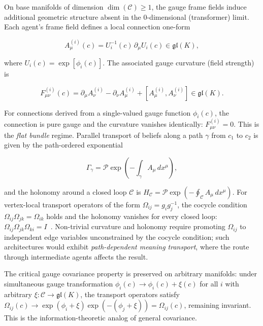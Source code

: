 \documentclass[11pt]{article}
\begin{document}
On base manifolds of dimension $\dim(\mathcal{C}) \geq 1$, the gauge frame fields induce additional geometric structure absent in the 0-dimensional (transformer) limit. Each agent's frame field defines a local connection one-form

\begin{equation}
A_\mu^{(i)}(c) = U_i^{-1}(c) \, \partial_\mu U_i(c) \in \mathfrak{gl}(K),
\label{eq:connection_form}
\end{equation}

where $U_i(c) = \exp[\phi_i(c)]$. The associated gauge curvature (field strength) is

\begin{equation}
F_{\mu\nu}^{(i)}(c) = \partial_\mu A_\nu^{(i)} - \partial_\nu A_\mu^{(i)} + [A_\mu^{(i)}, A_\nu^{(i)}] \in \mathfrak{gl}(K).
\label{eq:field_strength}
\end{equation}

For connections derived from a single-valued gauge function $\phi_i(c)$, the connection is pure gauge and the curvature vanishes identically: $F_{\mu\nu}^{(i)} = 0$. This is the \emph{flat bundle} regime. Parallel transport of beliefs along a path $\gamma$ from $c_1$ to $c_2$ is given by the path-ordered exponential

\begin{equation}
\Gamma_\gamma = \mathcal{P}\exp\!\left(-\int_\gamma A_\mu \, dx^\mu\right),
\label{eq:parallel_transport}
\end{equation}

and the holonomy around a closed loop $\mathcal{C}$ is $H_{\mathcal{C}} = \mathcal{P}\exp(-\oint_{\mathcal{C}} A_\mu \, dx^\mu)$. For vertex-local transport operators of the form $\Omega_{ij} = g_i g_j^{-1}$, the cocycle condition $\Omega_{ij}\Omega_{jk} = \Omega_{ik}$ holds and the holonomy vanishes for every closed loop: $\Omega_{ij}\Omega_{jk}\Omega_{ki} = I$~\cite{Dennis2026GL}. Non-trivial curvature and holonomy require promoting $\Omega_{ij}$ to independent edge variables unconstrained by the cocycle condition; such architectures would exhibit \emph{path-dependent meaning transport}, where the route through intermediate agents affects the result.

The critical gauge covariance property is preserved on arbitrary manifolds: under simultaneous gauge transformation $\phi_i(c) \to \phi_i(c) + \xi(c)$ for all $i$ with arbitrary $\xi: \mathcal{C} \to \mathfrak{gl}(K)$, the transport operators satisfy $\Omega_{ij}(c) \to \exp(\phi_i + \xi)\exp(-(\phi_j + \xi)) = \Omega_{ij}(c)$, remaining invariant. This is the information-theoretic analog of general covariance.
\end{document}
